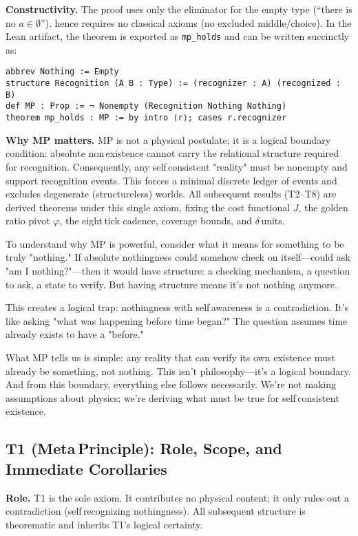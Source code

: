 \documentclass[11pt]{article}
\begin{document}
\textbf{Constructivity.} The proof uses only the eliminator for the empty type (``there is no $a\in\emptyset$''), hence requires no classical axioms (no excluded middle/choice). In the Lean artifact, the theorem is exported as \texttt{mp\_holds} and can be written succinctly as:

\begin{verbatim}
abbrev Nothing := Empty
structure Recognition (A B : Type) := (recognizer : A) (recognized : B)
def MP : Prop := ¬ Nonempty (Recognition Nothing Nothing)
theorem mp_holds : MP := by intro ⟨r⟩; cases r.recognizer
\end{verbatim}

\textbf{Why MP matters.} MP is not a physical postulate; it is a logical boundary condition: absolute non\,existence cannot carry the relational structure required for recognition. Consequently, any self\,consistent "reality" must be nonempty and support recognition events. This forces a minimal discrete ledger of events and excludes degenerate (structureless) worlds. All subsequent results (T2–T8) are derived theorems under this single axiom, fixing the cost functional $J$, the golden\,ratio pivot $\varphi$, the eight\,tick cadence, coverage bounds, and $\delta$\,units.

\begin{explanationbox}
To understand why MP is powerful, consider what it means for something to be truly "nothing." If absolute nothingness could somehow check on itself—could ask "am I nothing?"—then it would have structure: a checking mechanism, a question to ask, a state to verify. But having structure means it's not nothing anymore.

This creates a logical trap: nothingness with self\,awareness is a contradiction. It's like asking "what was happening before time began?" The question assumes time already exists to have a "before."

What MP tells us is simple: any reality that can verify its own existence must already be something, not nothing. This isn't philosophy—it's a logical boundary. And from this boundary, everything else follows necessarily. We're not making assumptions about physics; we're deriving what must be true for self\,consistent existence.
\end{explanationbox}

\subsection*{T1 (Meta\,Principle): Role, Scope, and Immediate Corollaries}
\textbf{Role.} T1 is the sole axiom. It contributes no physical content; it only rules out a contradiction (self\,recognizing nothingness). All subsequent structure is theorematic and inherits T1’s logical certainty.
\end{document}
